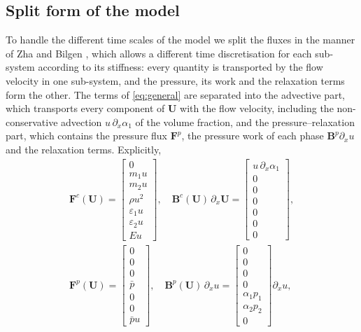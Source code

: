 \subsection{Split form of the model}
\label{sec:split}
To handle the different time scales of the model we split the fluxes in the manner of Zha and Bilgen
\cite{ZhaBilgen1993}, which allows a different time discretisation for each sub-system according to its stiffness: every
quantity is transported by the flow velocity in one sub-system, and the pressure, its work and the relaxation terms form
the other. The terms of \eqref{eq:general} are separated into the advective part, which transports every component of
$\mathbf U$ with the flow velocity, including the non-conservative advection $u\,\partial_x\alpha_1$ of the volume fraction, and the
pressure--relaxation part, which contains the pressure flux $\mathbf F^p$, the pressure work of each phase $\mathbf B^p\partial_xu$ and the relaxation terms.
Explicitly,
\begin{equation}
\begin{gathered}
\mathbf F^c(\mathbf U)=\begin{bmatrix}0\\ m_1u\\ m_2u\\ \rho u^2\\ \varepsilon_1u\\ \varepsilon_2u\\ Eu\end{bmatrix},\quad
\mathbf B^c(\mathbf U)\,\partial_x\mathbf U=\begin{bmatrix}u\,\partial_x\alpha_1\\0\\0\\0\\0\\0\\0\end{bmatrix},\\
\mathbf F^p(\mathbf U)=\begin{bmatrix}0\\0\\0\\ \bar p\\0\\0\\ \bar pu\end{bmatrix},\quad
\mathbf B^p(\mathbf U)\,\partial_xu=\begin{bmatrix}0\\0\\0\\0\\ \alpha_1p_1\\ \alpha_2p_2\\0\end{bmatrix}\partial_xu ,
\end{gathered}
\label{eq:split_fluxes}
\end{equation}
